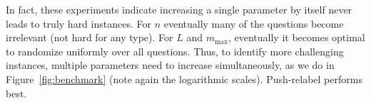 \documentclass{article}
\begin{document}
In fact, these experiments indicate increasing a single parameter by itself
never leads to truly hard instances.  For $n$ eventually many of the
questions become irrelevant (not hard for any type).  For $L$ and
$m_\text{max}$, eventually it becomes optimal to randomize uniformly over
all questions.
Thus, to identify more challenging instances, multiple parameters need to
increase simultaneously, as we do in Figure~\ref{fig:benchmark} (note again
the logarithmic scales).  Push-relabel performs best.





\end{document}
